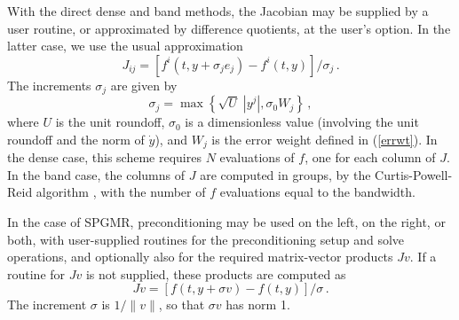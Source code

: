 With the direct dense and band methods, the Jacobian may be supplied
by a user routine, or approximated by difference quotients,
at the user's option.  In the latter case, we use the usual
approximation
\[ J_{ij} = [f^i(t,y+\sigma_j e_j) - f^i(t,y)]/\sigma_j \, . \]
The increments $\sigma_j$ are given by
\[ \sigma_j = \max\left\{\sqrt{U} \; |y^j| , \sigma_0 W_j \right\} \, , \]
where $U$ is the unit roundoff, $\sigma_0$ is a dimensionless value
(involving the unit roundoff and the norm of $\dot{y}$),
and $W_j$ is the error weight defined in (\ref{errwt}).  In the dense
case, this scheme requires $N$ evaluations of $f$, one for each column
of $J$.  In the band case, the columns of $J$ are computed in groups,
by the Curtis-Powell-Reid algorithm \cite{CPR:74}, with the number of
$f$ evaluations equal to the bandwidth.

In the case of SPGMR, preconditioning may be used on the left, on the
right, or both, with user-supplied routines for the preconditioning
setup and solve operations, and optionally also for the required
matrix-vector products $Jv$.  If a routine for $Jv$ is not supplied,
these products are computed as
\begin{equation}\label{jacobv}
Jv = [f(t,y+\sigma v) - f(t,y)]/\sigma \, . 
\end{equation}
The increment $\sigma$ is $1/\|v\|$, so that $\sigma v$ has norm 1.

